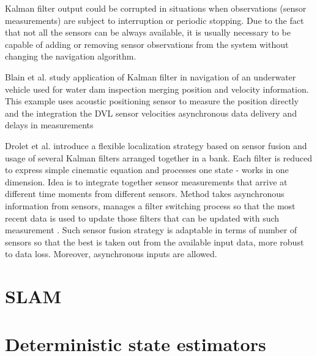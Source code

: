 Kalman filter output could be corrupted in situations when observations (sensor measurements) are subject to interruption or periodic stopping. Due to the fact that not all the sensors can be always available, it is usually necessary to be capable of adding or removing sensor observations from the system without changing the navigation algorithm. 

Blain et al. \cite{blain03} study application of Kalman filter in navigation of an underwater vehicle used for water dam inspection merging position and velocity information. This example uses acoustic positioning sensor to measure the position directly and the integration the DVL sensor velocities \cite{blain03}  asynchronous data delivery and delays in measurements


Drolet et al. \cite{drolet00} introduce a flexible localization strategy based on sensor fusion and usage of several Kalman filters arranged together in a bank. Each filter is reduced to express simple cinematic equation and processes one state - works in one dimension. Idea is to integrate together sensor measurements that arrive at different time moments from different sensors. Method takes asynchronous information from sensors, manages a filter switching process so that the most recent data is used to update those filters that can be updated with such measurement \cite{drolet00}. Such sensor fusion strategy is adaptable in terms of number of sensors so that the best is taken out from the available input data, more robust to data loss. Moreover, asynchronous inputs are allowed. 

\cite{diMassa97}
\cite{gade99}
\cite{eustice05}
\cite{roman05}
\cite{yun00}
\section{SLAM} \label{sec:slam}

\section{Deterministic state estimators}
 



